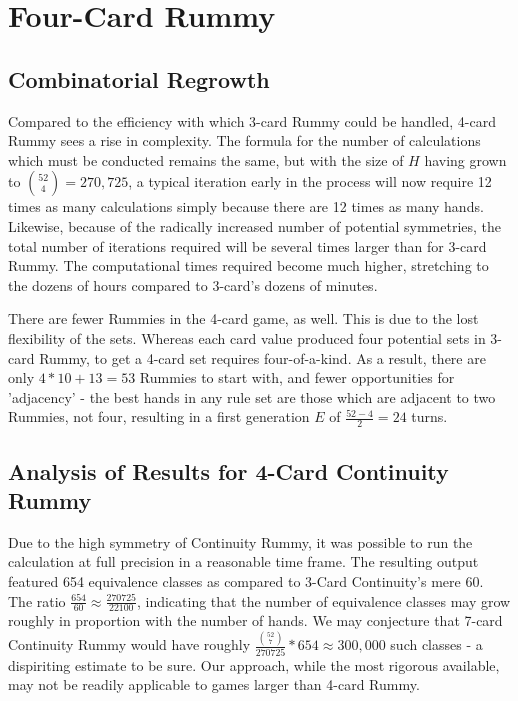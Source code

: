 \documentclass[paper=a4, fontsize=11pt,twoside]{report}   %
\begin{document}
\chapter{Four-Card Rummy}

\section{Combinatorial Regrowth}

Compared to the efficiency with which 3-card Rummy could be handled, 4-card Rummy sees a rise in complexity. The formula for the number of calculations which must be conducted remains the same, but with the size of $H$ having grown to $\binom{52}{4} = 270,725$, a typical iteration early in the process will now require 12 times as many calculations simply because there are 12 times as many hands. Likewise, because of the radically increased number of potential symmetries, the total number of iterations required will be several times larger than for 3-card Rummy. The computational times required become much higher, stretching to the dozens of hours compared to 3-card's dozens of minutes.

There are fewer Rummies in the 4-card game, as well. This is due to the lost flexibility of the sets. Whereas each card value produced four potential sets in 3-card Rummy, to get a 4-card set requires four-of-a-kind. As a result, there are only $4*10 + 13 = 53$ Rummies to start with, and fewer opportunities for 'adjacency' - the best hands in any rule set are those which are adjacent to two Rummies, not four, resulting in a first generation $E$ of $\frac{52-4}{2} = 24$ turns.

\section{Analysis of Results for 4-Card Continuity Rummy}

Due to the high symmetry of Continuity Rummy, it was possible to run the calculation at full precision in a reasonable time frame. The resulting output featured 654 equivalence classes as compared to 3-Card Continuity's mere 60. The ratio $\frac{654}{60} \approx \frac{270725}{22100}$, indicating that the number of equivalence classes may grow roughly in proportion with the number of hands. We may conjecture that 7-card Continuity Rummy would have roughly $\frac{\binom{52}{7}}{270725} * 654 \approx 300,000$ such classes - a dispiriting estimate to be sure. Our approach, while the most rigorous available, may not be readily applicable to games larger than 4-card Rummy.
\end{document}

